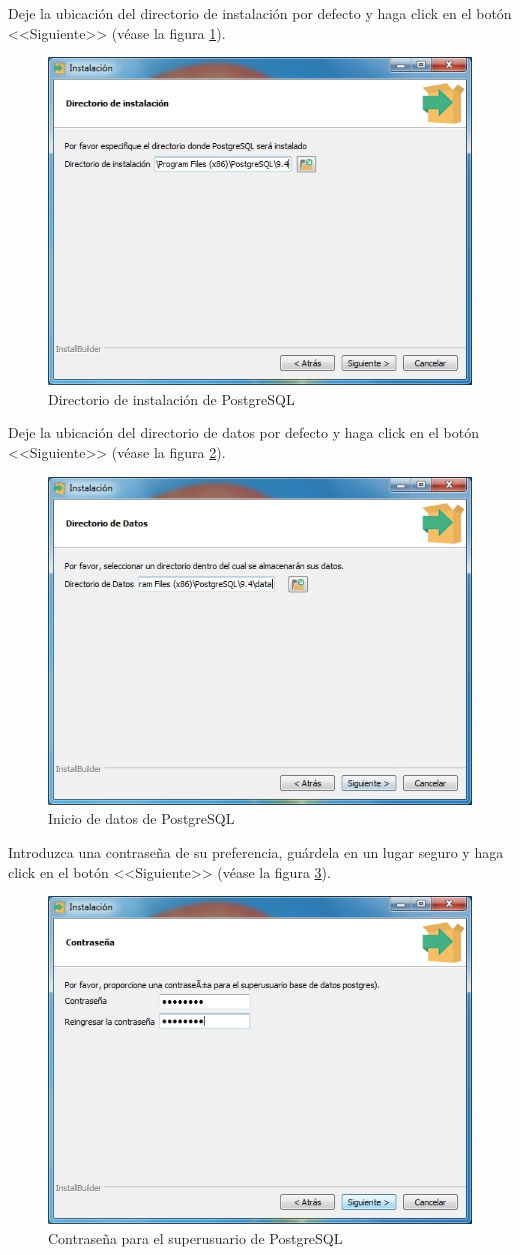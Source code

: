 Deje la ubicaci\'{o}n del directorio de instalaci\'{o}n por defecto y haga click en el bot\'{o}n <<Siguiente>> (v\'{e}ase la figura \ref{fig:postgres2}).

\begin{figure}[H]
  \centering
  \includegraphics[width=.6\linewidth]{./img/postgres2.jpg}
\caption[]{Directorio de instalaci\'{o}n de PostgreSQL\label{fig:postgres2}}
\end{figure}

\newpage

Deje la ubicaci\'{o}n del directorio de datos por defecto y haga click en el bot\'{o}n <<Siguiente>> (v\'{e}ase la figura \ref{fig:postgres3}).

\begin{figure}[H]
  \centering
  \includegraphics[width=.6\linewidth]{./img/postgres3.jpg}
\caption[]{Inicio de datos de PostgreSQL\label{fig:postgres3}}
\end{figure}

Introduzca una contrase\~{n}a de su preferencia, gu\'{a}rdela en un lugar seguro y haga click en el bot\'{o}n <<Siguiente>> (v\'{e}ase la figura \ref{fig:postgres4}).

\begin{figure}[H]
  \centering
  \includegraphics[width=.6\linewidth]{./img/postgres4.jpg}
\caption[]{Contrase\~{n}a para el superusuario de PostgreSQL\label{fig:postgres4}}
\end{figure}

